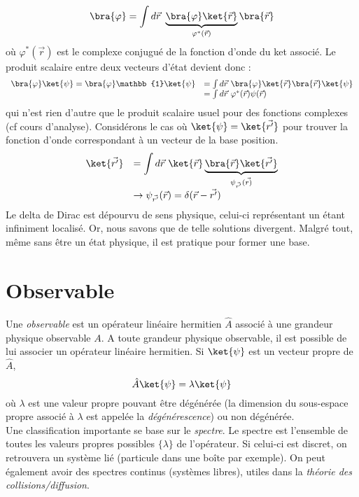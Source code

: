 \begin{equation}
\bra{\varphi} = \int d\vec{r}\ \underbrace{\bra{\varphi}\ket{\vec{r}}}_{
\varphi^*(\vec{r})}
\bra{\vec{r}}
\end{equation}
où $\varphi^*(\vec{r})$ est le complexe conjugué de la fonction d'onde du 
ket associé.
Le produit scalaire entre deux vecteurs d'état devient donc :
\begin{equation}
\begin{array}{ll}
\bra{\varphi}\ket{\psi} = \bra{\varphi}\mathbb{1}\ket{\psi} &= \int d\vec{r}\ 
\bra{\varphi}\ket{\vec{r}}\bra{\vec{r}}\ket{\psi}\\
&= \int d\vec{r}\ \varphi^*(\vec{r})\psi(\vec{r})
\end{array}
\end{equation}
qui n'est rien d'autre que le produit scalaire usuel pour des fonctions complexes (cf cours
d'analyse).
Considérons le cas où $\ket{\psi}=\ket{\vec{r'}}$
pour trouver la fonction d'onde correspondant à un vecteur de la base position.
\begin{equation}
\begin{array}{ll}
\ket{\vec{r'}} &= \displaystyle \int d\vec{r}\ \ket{\vec{r}}\underbrace{\bra{\vec{r}}\ket{\vec{r'}}}
_{\psi_{\vec{r'}}(\vec{r)}}\\
&\rightarrow\psi_{\vec{r'}}(\vec{r}) =\displaystyle \delta(\vec{r}-\vec{r'})
\end{array}
\end{equation}
Le delta de Dirac est dépourvu de sens physique, celui-ci représentant un étant 
infiniment localisé. Or, nous savons que de telle solutions divergent. Malgré tout, 
même sans être un état physique, 
il est pratique pour former une base.



\section{Observable}
Une \textit{observable} est un opérateur linéaire hermitien $\hat{A}$ associé à 
une grandeur physique observable $A$. A toute grandeur physique observable, il 
est possible de lui associer un opérateur linéaire  hermitien. Si $\ket{\psi}$
est un vecteur propre de $\hat{A}$,
\begin{equation}
\hat{A}\ket{\psi} = \lambda\ket{\psi}
\end{equation}
où $\lambda$ est une valeur propre pouvant être dégénérée (la dimension 
du sous-espace propre associé à $\lambda$ est appelée la \textit{dégénérescence}) 
ou non dégénérée.\\
Une classification importante se base sur le \textit{spectre}. Le spectre est
l'ensemble de toutes les valeurs propres possibles $\{\lambda\}$ de l'opérateur. Si celui-ci 
est discret, on retrouvera un système lié (particule dans une boîte par exemple). On 
peut également avoir des spectres continus (systèmes libres), utiles dans la 
\textit{théorie des collisions/diffusion}.\\

